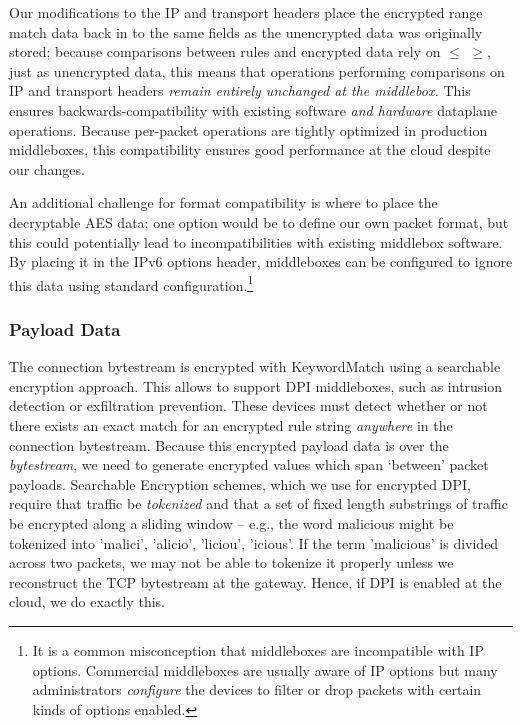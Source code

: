 Our modifications to the IP and transport headers place the encrypted range match data back in to the same fields as the unencrypted data was originally stored; because comparisons between rules and encrypted data rely on $\leq$ $\geq$, just as unencrypted data, this means that operations performing comparisons on IP and transport headers {\it remain entirely unchanged at the middlebox.}
This ensures backwards-compatibility with existing software {\it and hardware} dataplane operations.
Because per-packet operations are tightly optimized in production middleboxes, this compatibility ensures good performance at the cloud despite our changes.

An additional challenge for format compatibility is where to place the decryptable AES data; one option would be to define our own packet format, but this could potentially lead to incompatibilities with existing middlebox software. By placing it in the IPv6 options header, middleboxes can be configured to ignore this data using standard configuration.\footnote{It is a common misconception that middleboxes are incompatible with IP options. Commercial middleboxes are usually aware of IP options but many administrators {\it configure} the devices to filter or drop packets with certain kinds of options enabled.}


\subsubsection{Payload Data} 
The connection bytestream is encrypted with KeywordMatch using a searchable encryption approach.
This allows \sys to support DPI middleboxes, such as intrusion detection or exfiltration prevention.
These devices must detect whether or not there exists an exact match for an encrypted rule string {\it anywhere} in the connection bytestream.
Because this encrypted payload data is over the {\it bytestream}, we need to generate encrypted values which span `between' packet payloads. 
Searchable Encryption schemes, which we use for encrypted DPI, require that traffic be {\it tokenized} and that a set of fixed length substrings of traffic be encrypted along a sliding window -- e.g., the word malicious might be tokenized into {'malici', 'alicio', 'liciou', 'icious'}.
If the term 'malicious' is divided across two packets, we may not be able to tokenize it properly unless we reconstruct the TCP bytestream at the gateway. Hence, if DPI is enabled at the cloud, we do exactly this.


